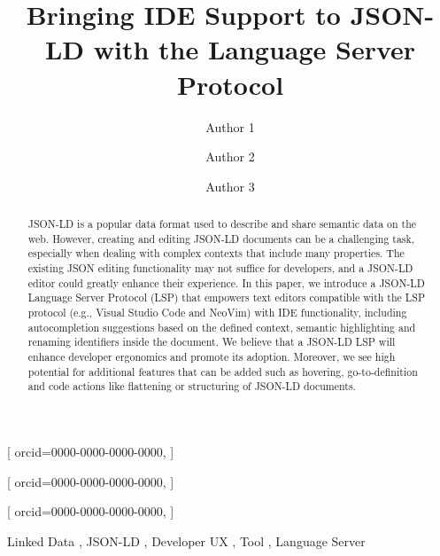 \documentclass[
]{ceurart}
\begin{document}



\title{Bringing IDE Support to JSON-LD with the Language Server Protocol}


\author[1]{Author 1}[%
orcid=0000-0000-0000-0000,
]
\author[1]{Author 2}[%
orcid=0000-0000-0000-0000,
]
\author[1]{Author 3}[%
orcid=0000-0000-0000-0000,
]
\address[1]{Some place on the world}


\begin{abstract}
  JSON-LD is a popular data format used to describe and share semantic data on the web.
  However, creating and editing JSON-LD documents can be a challenging task, especially when dealing with complex contexts that include many properties.
  The existing JSON editing functionality may not suffice for developers, and a JSON-LD editor could greatly enhance their experience.
  In this paper, we introduce a JSON-LD Language Server Protocol (LSP) that empowers text editors compatible with the LSP protocol (e.g., Visual Studio Code and NeoVim) with IDE functionality, including autocompletion suggestions based on the defined context, semantic highlighting and renaming identifiers inside the document.
  We believe that a JSON-LD LSP will enhance developer ergonomics and promote its adoption.
  Moreover, we see high potential for additional features that can be added such as hovering, go-to-definition and code actions like flattening or structuring of JSON-LD documents.
\end{abstract}

\begin{keywords}
  Linked Data \sep 
  JSON-LD \sep
  Developer UX \sep
  Tool \sep
  Language Server
\end{keywords}
\end{document}
